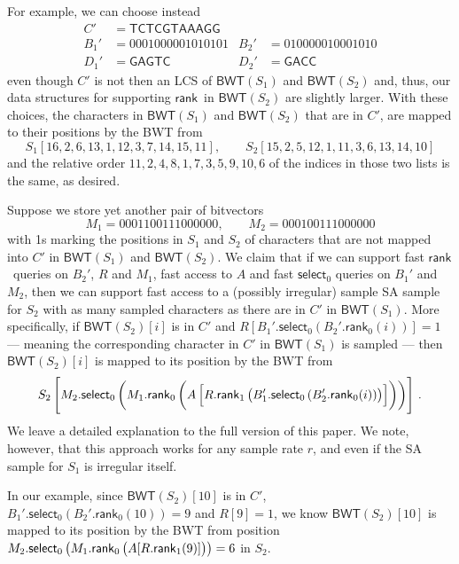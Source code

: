 \documentclass{llncs}
\newcommand{\BWT}
  {\ensuremath{\mathsf{BWT}}}
\newcommand{\rank}
  {\ensuremath{\mathsf{rank}}}
\newcommand{\select}
  {\ensuremath{\mathsf{select}}}
\begin{document}
For example, we can choose instead
\begin{align*}
C' & = \mathsf{TCTCGTAAAGG}\\
B_1' & = 0001000001010101 & B_2' & = 010000010001010\\
D_1' & = \mathsf{GAGTC} & D_2' & = \mathsf{GACC}
\end{align*}
even though $C'$ is not then an LCS of \(\BWT (S_1)\) and \(\BWT (S_2)\) and,
thus, our data structures for supporting \rank\ in \(\BWT (S_2)\) are
slightly larger.  With these choices, the characters in \(\BWT (S_1)\) and
\(\BWT (S_2)\) that are in $C'$, are mapped to their positions by the BWT
from
$$
S_1 [16, 2, 6, 13, 1, 12, 3, 7, 14, 15, 11],\qquad
S_2 [15, 2, 5, 12, 1, 11, 3, 6, 13, 14, 10]
$$
and the relative order \(11, 2, 4, 8, 1, 7, 3, 5, 9, 10, 6\) of the indices
in those two lists is the same, as desired.

Suppose we store yet another pair of bitvectors
$$
M_1 = 0001100111000000,\qquad
M_2 = 000100111000000
$$
with 1s marking the positions in $S_1$ and $S_2$ of characters that are not
mapped into $C'$ in \(\BWT (S_1)\) and \(\BWT (S_2)\).  We claim that if we
can support fast \rank\ queries on $B_2'$, $R$ and $M_1$, fast access to $A$
and fast $\select_0$ queries on $B_1'$ and $M_2$, then we can support fast
access to a (possibly irregular) sample SA sample for $S_2$ with as many
sampled characters as there are in $C'$ in \(\BWT (S_1)\).  More
specifically, if \(\BWT (S_2) [i]\) is in $C'$ and
\(R [B_1'.\select_0 (B_2'.\rank_0 (i))] = 1\)
--- meaning the corresponding character in $C'$ in \(\BWT (S_1)\) is sampled --- then \(\BWT (S_2) [i]\) is mapped to its position by the BWT from
\[S_2 \left[ \rule{0ex}{4ex}
    M_2.\select_0 \left( \rule{0ex}{3.5ex}
      M_1.\rank_0 \left( \rule{0ex}{3ex}
        A \left[ \rule{0ex}{2.5ex}
          R.\rank_1 \left( \rule{0ex}{2ex}
            B_1'.\select_0 \left(
              B_2'.\rank_0 (i)
            \right)
          \right)
        \right]
      \right)
    \right)
  \right]\,.\]
We leave a detailed explanation to the full version of this paper.  We note,
however, that this approach works for any sample rate $r$, and even if the SA
sample for $S_1$ is irregular itself.

In our example, since \(\BWT (S_2) [10]\) is in $C'$, \(B_1'.\select_0
(B_2'.\rank_0 (10)) = 9\) and \(R [9] = 1\), we know \(\BWT (S_2) [10]\) is
mapped to its position by the BWT from position
\(M_2.\select_0 \left(
    M_1.\rank_0 \left( \rule{0ex}{2ex}
      A [R.\rank_1 (9)]
    \right)
  \right)
= 6\)
in \(S_2\).
\end{document}
